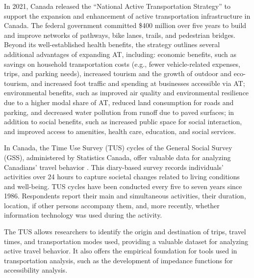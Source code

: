 \documentclass[preprint, 3p,
authoryear]{elsarticle} %
\begin{document}
In 2021, Canada released the ``National Active Transportation Strategy''
\citep{canada2021} to support the expansion and enhancement of active
transportation infrastructure in Canada. The federal government
committed \$400 million over five years to build and improve networks of
pathways, bike lanes, trails, and pedestrian bridges. Beyond its
well-established health benefits, the strategy outlines several
additional advantages of expanding AT, including: economic benefits,
such as savings on household transportation costs (e.g., fewer
vehicle-related expenses, trips, and parking needs), increased tourism
and the growth of outdoor and eco-tourism, and increased foot traffic
and spending at businesses accessible via AT; environmental benefits,
such as improved air quality and environmental resilience due to a
higher modal share of AT, reduced land consumption for roads and
parking, and decreased water pollution from runoff due to paved
surfaces; in addition to social benefits, such as increased public space
for social interaction, and improved access to amenities, health care,
education, and social services.

In Canada, the Time Use Survey (TUS) cycles of the General Social Survey
(GSS), administered by Statistics Canada, offer valuable data for
analyzing Canadians' travel behavior \citep{statisticscanada2022}. This
diary-based survey records individuals' activities over 24 hours to
capture societal changes related to living conditions and well-being.
TUS cycles have been conducted every five to seven years since 1986.
Respondents report their main and simultaneous activities, their
duration, location, if other persons accompany them, and, more recently,
whether information technology was used during the activity.

The TUS allows researchers to identify the origin and destination of
trips, travel times, and transportation modes used, providing a valuable
dataset for analyzing active travel behavior. It also offers the
empirical foundation for tools used in transportation analysis, such as
the development of impedance functions for accessibility analysis.
\end{document}
